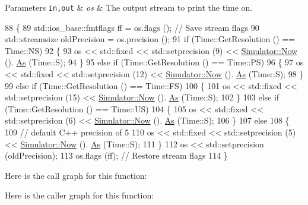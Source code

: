 \begin{DoxyParams}[1]{Parameters}
\mbox{\tt in,out}  & {\em os} & The output stream to print the time on. \\
\hline
\end{DoxyParams}

\begin{DoxyCode}
88 \{
89   std::ios\_base::fmtflags ff = os.flags (); \textcolor{comment}{// Save stream flags}
90   std::streamsize oldPrecision = os.precision ();
91   \textcolor{keywordflow}{if} (Time::GetResolution () == Time::NS)
92     \{
93       os << std::fixed << std::setprecision (9) << \hyperlink{group__simulator_gac3635e2e87f7ce316c89290ee1b01d0d}{Simulator::Now} ().
      \hyperlink{classns3_1_1Time_a0bb1110638ce9938248bd07865a328ab}{As} (Time::S);
94     \}
95   \textcolor{keywordflow}{else} \textcolor{keywordflow}{if} (Time::GetResolution () == Time::PS) 
96     \{
97       os << std::fixed << std::setprecision (12) << \hyperlink{group__simulator_gac3635e2e87f7ce316c89290ee1b01d0d}{Simulator::Now} ().
      \hyperlink{classns3_1_1Time_a0bb1110638ce9938248bd07865a328ab}{As} (Time::S);
98     \}
99   \textcolor{keywordflow}{else} \textcolor{keywordflow}{if} (Time::GetResolution () == Time::FS) 
100     \{
101       os << std::fixed << std::setprecision (15) << \hyperlink{group__simulator_gac3635e2e87f7ce316c89290ee1b01d0d}{Simulator::Now} ().
      \hyperlink{classns3_1_1Time_a0bb1110638ce9938248bd07865a328ab}{As} (Time::S);
102     \}
103   \textcolor{keywordflow}{else} \textcolor{keywordflow}{if} (Time::GetResolution () == Time::US) 
104     \{
105       os << std::fixed << std::setprecision (6) << \hyperlink{group__simulator_gac3635e2e87f7ce316c89290ee1b01d0d}{Simulator::Now} ().
      \hyperlink{classns3_1_1Time_a0bb1110638ce9938248bd07865a328ab}{As} (Time::S);
106     \}
107   \textcolor{keywordflow}{else}
108     \{
109       \textcolor{comment}{// default C++ precision of 5}
110       os << std::fixed << std::setprecision (5) << \hyperlink{group__simulator_gac3635e2e87f7ce316c89290ee1b01d0d}{Simulator::Now} ().
      \hyperlink{classns3_1_1Time_a0bb1110638ce9938248bd07865a328ab}{As} (Time::S);
111     \}
112   os << std::setprecision (oldPrecision);
113   os.flags (ff); \textcolor{comment}{// Restore stream flags}
114 \}
\end{DoxyCode}


Here is the call graph for this function\+:




Here is the caller graph for this function\+:




